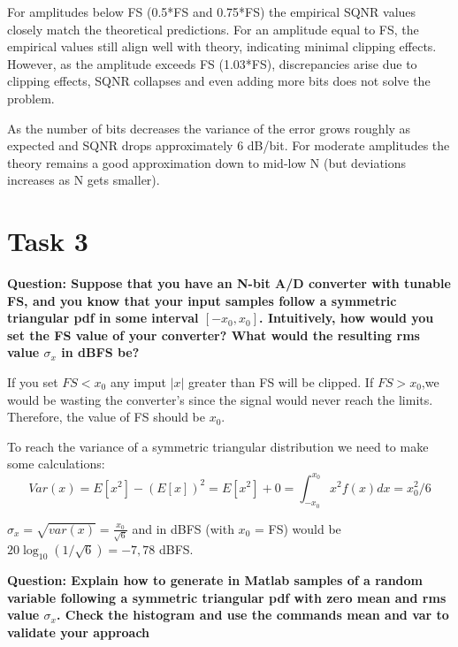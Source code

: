 \documentclass[11pt,a4paper]{article}
\begin{document}
For amplitudes below FS (0.5*FS and 0.75*FS) the empirical SQNR values closely match the theoretical predictions.
For an amplitude equal to FS, the empirical values still align well with theory, indicating minimal clipping effects.
However, as the amplitude exceeds FS (1.03*FS), discrepancies arise due to clipping effects, SQNR collapses and even adding more bits does not solve the problem.

As the number of bits decreases the variance of the error grows roughly as expected and SQNR drops approximately 6 dB/bit.
For moderate amplitudes the theory remains a good approximation down to mid-low N (but deviations increases as N gets smaller).

\section{Task 3}
\textbf{Question: Suppose that you have an N-bit A/D converter with tunable FS, and you know that your input samples follow
    a symmetric triangular pdf in some interval $[-x_0,x_0]$. Intuitively, how would you set the FS value of your converter?
    What would the resulting rms value $\sigma_x$ in dBFS be?
}

\vspace{0.5cm}
If you set $FS < x_0$ any imput $|x|$ greater than FS will be clipped. If $FS > x_0$,we would be wasting the converter's since the signal would never
reach the limits. Therefore, the value of FS should be $x_0$.

To reach the variance of a symmetric triangular distribution we need to make some calculations:
\[
Var(x) = E[x^2] - (E[x])^2 = E[x^2] + 0 = \int_{-x_0}^{x_0} x^2 f(x) dx = x_0^2/6
\]

$\sigma_x = \sqrt{var(x)} = \frac{x_0}{\sqrt{6}}$ and in dBFS (with $x_0$ = FS) would be $20\log_{10}(1/\sqrt{6}) = -7,78$ dBFS.

\vspace{1cm}
\textbf{Question: Explain how to generate in Matlab samples of a random variable following a symmetric triangular pdf with
    zero mean and rms value $\sigma_x$. Check the histogram and use the commands mean and var to validate your approach
}
\end{document}
